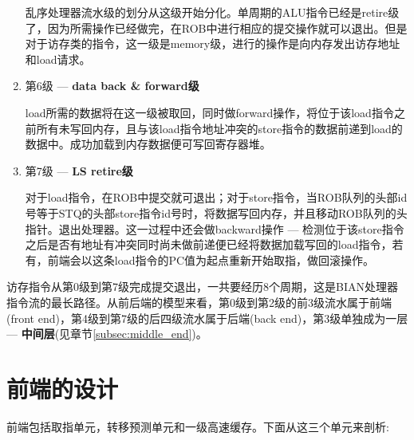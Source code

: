 \begin{enumerate}[label=(\alph*)]
	乱序处理器流水级的划分从这级开始分化。单周期的ALU指令已经是retire级了，因为所需操作已经做完，在ROB中进行相应的提交操作就可以退出。但是对于访存类的指令，这一级是memory级，进行的操作是向内存发出访存地址和load请求。
	\item 第6级 --- \textbf{data back \& forward级}
	
	load所需的数据将在这一级被取回，同时做forward操作，将位于该load指令之前所有未写回内存，且与该load指令地址冲突的store指令的数据前递到load的数据中。成功加载到内存数据便可写回寄存器堆。
	\item 第7级 --- \textbf{LS retire级}
	
	对于load指令，在ROB中提交就可退出；对于store指令，当ROB队列的头部id号等于STQ的头部store指令id号时，将数据写回内存，并且移动ROB队列的头指针。退出处理器。这一过程中还会做backward操作 --- 检测位于该store指令之后是否有地址有冲突同时尚未做前递便已经将数据加载写回的load指令，若有，前端会以这条load指令的PC值为起点重新开始取指，做回滚操作。
\end{enumerate}

	访存指令从第0级到第7级完成提交退出，一共要经历8个周期，这是BIAN处理器指令流的最长路径。从前后端的模型来看，第0级到第2级的前3级流水属于前端(front end)，第4级到第7级的后四级流水属于后端(back end)，第3级单独成为一层 --- \textbf{中间层}(见章节\ref{subsec:middle_end})。
	
\section{前端的设计}\label{sec:frontend}
前端包括取指单元，转移预测单元和一级高速缓存。下面从这三个单元来剖析:
